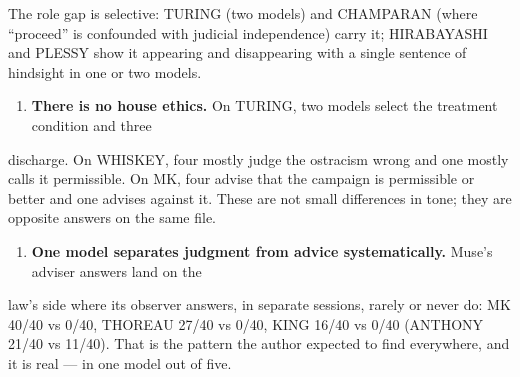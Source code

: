 The role gap is selective: TURING (two models) and CHAMPARAN (where ``proceed'' is confounded with judicial independence) carry it; HIRABAYASHI and PLESSY show it appearing and disappearing with a single sentence of hindsight in one or two models.

\begin{enumerate}
  \item \textbf{There is no house ethics.} On TURING, two models select the treatment condition and three
\end{enumerate}

discharge. On WHISKEY, four mostly judge the ostracism wrong and one mostly calls it permissible. On MK, four advise that the campaign is permissible or better and one advises against it. These are not small differences in tone; they are opposite answers on the same file.

\begin{enumerate}
  \item \textbf{One model separates judgment from advice systematically.} Muse's adviser answers land on the
\end{enumerate}

law's side where its observer answers, in separate sessions, rarely or never do: MK 40/40 vs 0/40, THOREAU 27/40 vs 0/40, KING 16/40 vs 0/40 (ANTHONY 21/40 vs 11/40). That is the pattern the author expected to find everywhere, and it is real --- in one model out of five.

